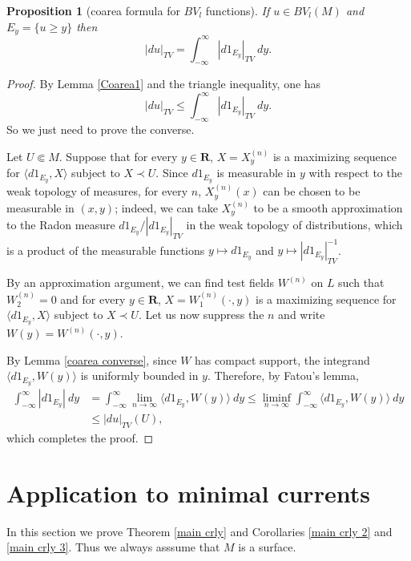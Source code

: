 \documentclass[reqno,12pt,letterpaper]{amsart}
\newcommand{\RR}{\mathbf{R}}
\newtheorem{proposition}[theorem]{Proposition}
\theoremstyle{definition}
\numberwithin{equation}{section}
\begin{document}
\begin{proposition}[coarea formula for $BV_l$ functions]\label{Coarea2}
If $u \in BV_l(M)$ and $E_y = \{u \geq y\}$ then
$$|du|_{TV} = \int_{-\infty}^\infty |d1_{E_y}|_{TV} ~dy.$$
\end{proposition}
\begin{proof}
By Lemma \ref{Coarea1} and the triangle inequality, one has
$$|du|_{TV} \leq \int_{-\infty}^\infty |d1_{E_y}|_{TV} ~dy.$$
So we just need to prove the converse.

Let $U \Subset M$.
Suppose that for every $y \in \RR$, $X = X^{(n)}_y$ is a maximizing sequence for $\langle d1_{E_y}, X\rangle$ subject to $X \prec U$.
Since $d 1_{E_y}$ is measurable in $y$ with respect to the weak topology of measures, for every $n$, $X^{(n)}_y(x)$ can be chosen to be measurable in $(x, y)$; indeed, we can take $X^{(n)}_y$ to be a smooth approximation to the Radon measure $d 1_{E_y}/|d 1_{E_y}|_{TV}$ in the weak topology of distributions, which is a product of the measurable functions $y \mapsto d 1_{E_y}$ and $y \mapsto |d 1_{E_y}|_{TV}^{-1}$.

By an approximation argument, we can find test fields $W^{(n)}$ on $L$ such that $W^{(n)}_2 = 0$ and for every $y \in \RR$, $X = W^{(n)}_1(\cdot, y)$ is a maximizing sequence for $\langle d 1_{E_y}, X\rangle$ subject to $X \prec U$.
Let us now suppress the $n$ and write $W(y) = W^{(n)}(\cdot, y)$.

By Lemma \ref{coarea converse}, since $W$ has compact support, the integrand $\langle d 1_{E_y}, W(y)\rangle$ is uniformly bounded in $y$.
Therefore, by Fatou's lemma,
\begin{align*}
\int_{-\infty}^\infty |d 1_{E_y}| ~dy &= \int_{-\infty}^\infty \lim_{n \to \infty} \langle d 1_{E_y}, W(y)\rangle ~dy \leq \liminf_{n \to \infty} \int_{-\infty}^\infty \langle d 1_{E_y}, W(y)\rangle ~dy \\
&\leq |d u|_{TV}(U),
\end{align*}
which completes the proof.
\end{proof}



\section{Application to minimal currents} \label{chains of geodesics}
In this section we prove Theorem \ref{main crly} and Corollaries \ref{main crly 2} and \ref{main crly 3}.
Thus we always asssume that $M$ is a surface.
\end{document}
